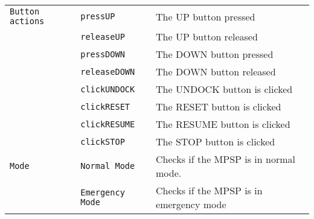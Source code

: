 \begin{table}
\begin{tabular}{l|ll}
 \verb$Button actions$ & \verb$pressUP$ & The UP button pressed\\
  & \verb$releaseUP$ & The UP button released\\
  & \verb$pressDOWN$ & The DOWN button pressed\\
  & \verb$releaseDOWN$ & The DOWN button released\\
  & \verb$clickUNDOCK$ & The UNDOCK button is clicked \\
  & \verb$clickRESET$ & The RESET button is clicked\\
  & \verb$clickRESUME$ & The RESUME button is clicked\\
  & \verb$clickSTOP$ & The STOP button is clicked\\
  \hline
  
  \verb$Mode$ & \verb$Normal Mode$ & Checks if the MPSP is in normal mode.  \\
  & \verb$Emergency Mode$ & Checks if the MPSP is in emergency mode\\
  \hline
\end{tabular}

\end{table}
